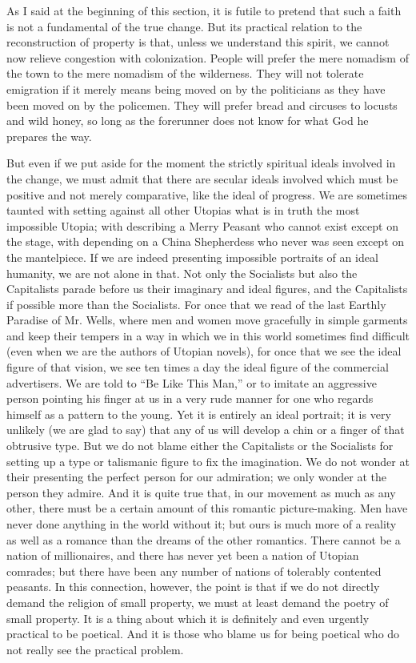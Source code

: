 \documentclass{book}
\begin{document}
As I said at the beginning of this section, it is futile to pretend that such a faith is not a fundamental of the true change. But its practical relation to the reconstruction of property is that, unless we understand this spirit, we cannot now relieve congestion with colonization. People will prefer the mere nomadism of the town to the mere nomadism of the wilderness. They will not tolerate emigration if it merely means being moved on by the politicians as they have been moved on by the policemen. They will prefer bread and circuses to locusts and wild honey, so long as the forerunner does not know for what God he prepares the way.

But even if we put aside for the moment the strictly spiritual ideals involved in the change, we must admit that there are secular ideals involved which must be positive and not merely comparative, like the ideal of progress. We are sometimes taunted with setting against all other Utopias what is in truth the most impossible Utopia; with describing a Merry Peasant who cannot exist except on the stage, with depending on a China Shepherdess who never was seen except on the mantelpiece. If we are indeed presenting impossible portraits of an ideal humanity, we are not alone in that. Not only the Socialists but also the Capitalists parade before us their imaginary and ideal figures, and the Capitalists if possible more than the Socialists. For once that we read of the last Earthly Paradise of Mr. Wells, where men and women move gracefully in simple garments and keep their tempers in a way in which we in this world sometimes find difficult (even when we are the authors of Utopian novels), for once that we see the ideal figure of that vision, we see ten times a day the ideal figure of the commercial advertisers. We are told to “Be Like This Man,” or to imitate an aggressive person pointing his finger at us in a very rude manner for one who regards himself as a pattern to the young. Yet it is entirely an ideal portrait; it is very unlikely (we are glad to say) that any of us will develop a chin or a finger of that obtrusive type. But we do not blame either the Capitalists or the Socialists for setting up a type or talismanic figure to fix the imagination. We do not wonder at their presenting the perfect person for our admiration; we only wonder at the person they admire. And it is quite true that, in our movement as much as any other, there must be a certain amount of this romantic picture-making. Men have never done anything in the world without it; but ours is much more of a reality as well as a romance than the dreams of the other romantics. There cannot be a nation of millionaires, and there has never yet been a nation of Utopian comrades; but there have been any number of nations of tolerably contented peasants. In this connection, however, the point is that if we do not directly demand the religion of small property, we must at least demand the poetry of small property. It is a thing about which it is definitely and even urgently practical to be poetical. And it is those who blame us for being poetical who do not really see the practical problem.
\end{document}
